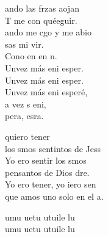\documentclass[12pt]{article}
\begin{document}
\begin{multicols*}{2}
\begin{cancion}%
	ando las frzas aojan\\
	T me con quéeguir. \\
\jump
	ando me cgo y me abio \\
	 sas mi vir. \\
\jump
	Cono en en n. \\
	Unvez más eni esper.\\
	Unvez más eni esper.\\
	Unvez más eni esperé,\\
	a vez s eni, \\
	 pera,  esra.  \\
\end{cancion}%

\begin{cancion}%
	 quiero tener\\
	los smos sentintos de Jess\\
	Yo ero sentir los smos\\
	pensantos de Dios dre.\\
	Yo ero tener, yo iero sen\\
	que amos uno solo en el a.\\
\end{cancion}%

\begin{cancion}[Utufuile][]%
	umu uetu utuile lu\\
	umu uetu utuile lu\\
\end{cancion}%


\end{multicols*}
\end{document}

